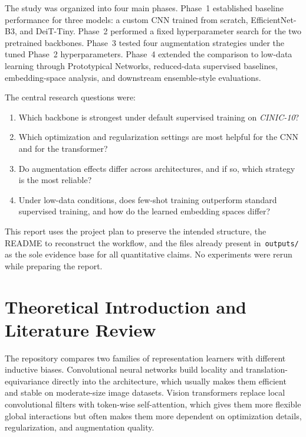 \documentclass[12pt,a4paper]{article}
\begin{document}
The study was organized into four main phases. Phase~1 established baseline performance for three models: a custom CNN trained from scratch, EfficientNet-B3, and DeiT-Tiny. Phase~2 performed a fixed hyperparameter search for the two pretrained backbones. Phase~3 tested four augmentation strategies under the tuned Phase~2 hyperparameters. Phase~4 extended the comparison to low-data learning through Prototypical Networks, reduced-data supervised baselines, embedding-space analysis, and downstream ensemble-style evaluations.

The central research questions were:

\begin{enumerate}[nosep]
    \item Which backbone is strongest under default supervised training on \emph{CINIC-10}?
    \item Which optimization and regularization settings are most helpful for the CNN and for the transformer?
    \item Do augmentation effects differ across architectures, and if so, which strategy is the most reliable?
    \item Under low-data conditions, does few-shot training outperform standard supervised training, and how do the learned embedding spaces differ?
\end{enumerate}

This report uses the project plan to preserve the intended structure, the README to reconstruct the workflow, and the files already present in~\texttt{outputs/} as the sole evidence base for all quantitative claims. No experiments were rerun while preparing the report.

\section{Theoretical Introduction and Literature Review}
\label{sec:theory}


The repository compares two families of representation learners with different inductive biases. Convolutional neural networks build locality and translation-equivariance directly into the architecture, which usually makes them efficient and stable on moderate-size image datasets. Vision transformers replace local convolutional filters with token-wise self-attention, which gives them more flexible global interactions but often makes them more dependent on optimization details, regularization, and augmentation quality.
\end{document}
